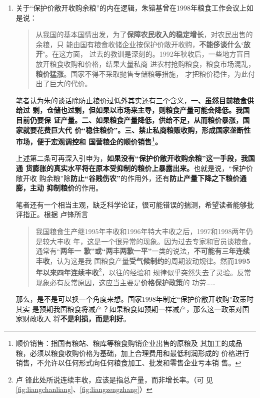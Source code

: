 \begin{enumerate}
\item 关于“保护价敞开收购余粮”的内在逻辑，朱镕基曾在1998年粮食工作会议上如是说：
  \begin{quotation}
    从我国的基本国情出发，为了\textbf{保障农民收入的稳定增长}，对农民出售的余粮，只
    能由国有粮食收储企业按保护价敞开收购，\textbf{不能侈谈什么‘放开’}。在这方面，
    过去的教训是深刻的。1992年秋收后，一些地方盲目放开粮食收购和价格，结果大量私商
    进农村抢购粮食，粮食市场混乱，\textbf{粮价猛涨}。国家不得不采取抛售专储粮等措施，
    才把粮价稳住，为此付出了巨大的代价。\cite{zhuchangkai}
  \end{quotation}

  笔者认为朱的谈话除防止粮价过低外其实还有三个含义，\textbf{一、虽然目前粮食供给过
    剩，仓储也过剩，但如果以市场来主导，则粮食产量可能会降低。我国目前仍要保
    证产量。二、如果粮食产量降低，供给不足，从而粮价暴涨，国家就要花费巨大代
    价“稳住粮价”。三、禁止私商粮贩收购，形成国家垄断性市场，便于宏观调控和
    国营粮企的顺价销售\footnote{顺价销售：指国有粮站、粮库等粮食购销企业出售的原粮及
      其加工的成品粮，必须以粮食收购价格为基础，加上合理费用和最低利润形成的
      价格进行销售，不允许以任何形式向任何粮食加工、批发和零售企业亏本销
      售。}。}

  上述第二条可再深入引申为，\textbf{如果没有“保护价敞开收购余粮”这一手段，我国通
    货膨胀的真实水平将在原本受抑制的粮价上暴露出来。}也就是说，“保护价敞开收
  购余粮”除\textbf{防止“谷贱伤农”}的作用外，还有\textbf{防止产量下降之下粮价通膨，主动
    抑制粮价}的作用。

  笔者还有一个相当主观，缺乏科学论证，很可能错误的揣测，希望读者能够批评指正。根据
  卢锋所言
  \begin{quotation}
    我国粮食生产继1995年丰收和1996年特大丰收之后，1997和1998两年仍是较大丰收
    年，这是一个很异常的现象。因为过去专家和官员谈粮食，通常有“\textbf{两年一
      歉”或“两丰两歉一平”}一类的说法，\textbf{不可能有三年连续丰收}，认为这是我
    国粮食产量\textbf{受气候制约}的周期波动规律。然而\textbf{1995年以来四年连续丰收}\footnote{卢
      锋此处所说连续丰收，应该是指总产量，而非增长率。（可
      见\cref{fig:liangchanliang}、\cref{fig:liangzengzhang}）}，以往的经验和
    规律似乎突然失去了灵验。反常现象必有反常原因，这应当主要是\textbf{价格保护政策}的
    功劳……
  \end{quotation}
  那么，是不是可以换一个角度来想。国家1998年制定“保护价敞开收购”政策时其实
  是预期我国粮食将减产？如果粮食如预期一样减产，那么这一政策对国家财政收入
  将\textbf{不是利损，而是利好}。


\end{enumerate}
